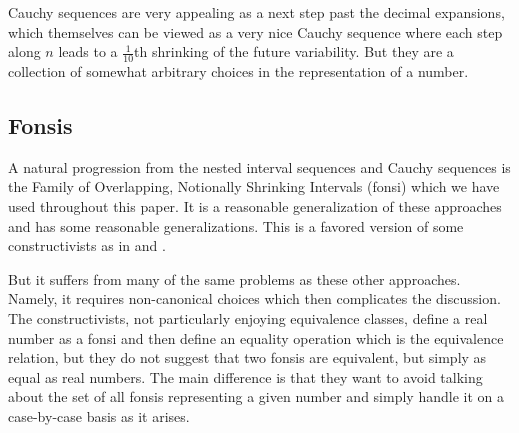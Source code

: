 \documentclass[12pt]{article}
\theoremstyle{remark}
\begin{document}
Cauchy sequences are very appealing as a next step past the decimal expansions, which themselves can be viewed as a very nice Cauchy sequence where each step along $n$ leads to a $\frac{1}{10}$th shrinking of the future variability. But they are a collection of somewhat arbitrary choices in the representation of a number. 

\subsection{Fonsis}

A natural progression from the nested interval sequences and Cauchy sequences is the Family of Overlapping, Notionally Shrinking Intervals (fonsi) which we have used throughout this paper. It is a reasonable generalization of these approaches and has some reasonable generalizations. This is a favored version of some constructivists as in \cite{bridger} and \cite{bridges}. 

But it suffers from many of the same problems as these other approaches. Namely, it requires non-canonical choices which then complicates the discussion. The constructivists, not particularly enjoying equivalence classes, define a real number as a fonsi and then define an equality operation which is the equivalence relation, but they do not suggest that two fonsis are equivalent, but simply as equal as real numbers. The main difference is that they want to avoid talking about the set of all fonsis representing a given number and simply handle it on a case-by-case basis as it arises. 
\end{document}
